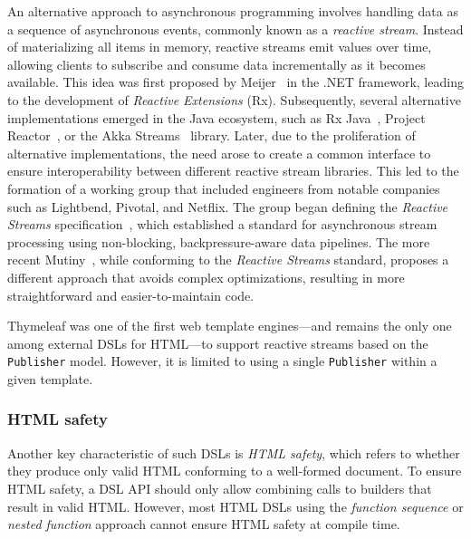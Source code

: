 An alternative approach to asynchronous programming involves handling data as
a sequence of asynchronous events, commonly known as a \textit{reactive stream}.
Instead of materializing all items in memory, reactive streams emit values over
time, allowing clients to subscribe and consume data incrementally as it becomes
available.
This idea was first proposed by Meijer~\cite{rx-observable} in the .NET
framework, leading to the development of \textit{Reactive Extensions} (Rx).
Subsequently, several alternative implementations emerged in the Java ecosystem,
such as Rx Java~\cite{rxjava}, Project Reactor~\cite{projectreactor}, or the
Akka Streams~\cite{akka} library.
Later, due to the proliferation of alternative implementations, the need arose to
create a common interface to ensure interoperability between different reactive
stream libraries. This led to the formation of a working group that included
engineers from notable companies such as Lightbend, Pivotal, and Netflix.
The group began defining the \textit{Reactive Streams}
specification~\cite{ReactiveStreams}, which established a standard for
asynchronous stream processing using non-blocking, backpressure-aware data
pipelines.
The more recent Mutiny~\cite{mutiny2021}, while conforming to the
\textit{Reactive Streams} standard, proposes a different approach that avoids
complex optimizations, resulting in more straightforward and easier-to-maintain
code.

Thymeleaf was one of the first web template engines—and remains the only one
among external DSLs for HTML—to support reactive streams based on the
\texttt{Publisher} model. However, it is limited to using a single
\texttt{Publisher} within a given template.


\subsubsection{HTML safety}

Another key characteristic of such DSLs is \textit{HTML safety}, which refers
to whether they produce only valid HTML conforming to a well-formed document.
To ensure HTML safety, a DSL API should only allow combining calls to builders
that result in valid HTML. However, most HTML DSLs using the \textit{function
  sequence} or \textit{nested function} approach cannot ensure HTML safety at
compile time.

